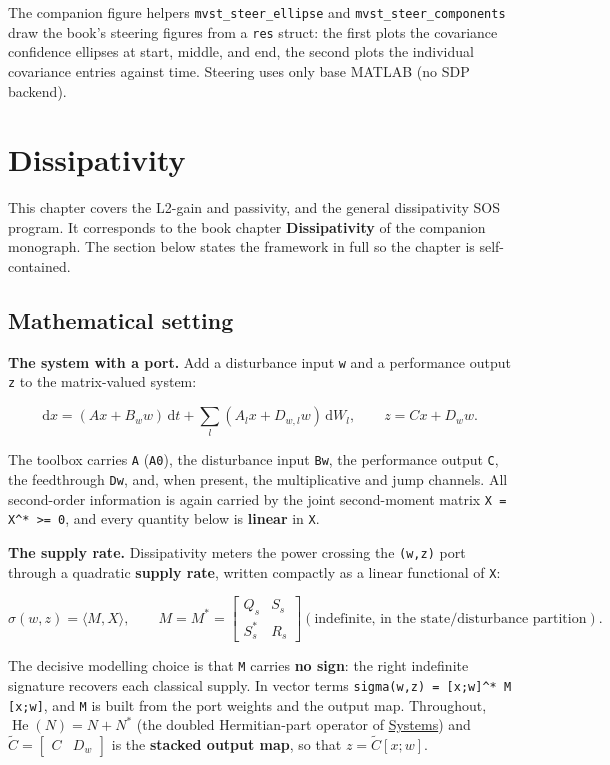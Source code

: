 \documentclass[11pt,oneside]{report}
\newcommand{\code}[1]{\texttt{#1}}
\begin{document}
The companion figure helpers \code{mvst\_steer\_ellipse} and \code{mvst\_steer\_components}
draw the book's steering figures from a \code{res} struct: the first plots the
covariance confidence ellipses at start, middle, and end, the second plots the
individual covariance entries against time. Steering uses only base MATLAB (no
SDP backend).


\hypertarget{chap:07-dissipativity}{%
\chapter{Dissipativity}\label{chap:07-dissipativity}}

This chapter covers the L2-gain and passivity, and the general dissipativity SOS
program. It corresponds to the book chapter \textbf{Dissipativity} of the companion
monograph. The section below states the framework in full so the chapter is
self-contained.

\hypertarget{mathematical-setting}{%
\section{Mathematical setting}\label{mathematical-setting}}

\textbf{The system with a port.} Add a disturbance input \code{w} and a performance
output \code{z} to the matrix-valued system:

\[
\mathrm{d}x = (A x + B_w w)\,\mathrm{d}t
   + \sum_l (A_l x + D_{w,l} w)\,\mathrm{d}W_l ,
\qquad
z = C x + D_w w .
\]

The toolbox carries \code{A} (\code{A0}), the disturbance input \code{Bw}, the performance
output \code{C}, the feedthrough \code{Dw}, and, when present, the multiplicative and jump
channels. All second-order information is again carried by the joint
second-moment matrix \code{X = X\^{}* \textgreater{}= 0}, and every quantity below is \textbf{linear} in
\code{X}.

\textbf{The supply rate.} Dissipativity meters the power crossing the \code{(w,z)} port
through a quadratic \textbf{supply rate}, written compactly as a linear functional of
\code{X}:

\[
\sigma(w,z) = \langle M, X\rangle ,
\qquad
M = M^{*} =
\begin{bmatrix} Q_s & S_s \\ S_s^{*} & R_s \end{bmatrix}
  (\text{indefinite, in the state/disturbance partition}).
\]

The decisive modelling choice is that \code{M} carries \textbf{no sign}: the right
indefinite signature recovers each classical supply. In vector terms
\code{sigma(w,z) = [x;w]\^{}* M [x;w]}, and \code{M} is built from the port weights and the
output map. Throughout, \(\operatorname{He}(N) = N + N^{*}\) (the doubled
Hermitian-part operator of \protect\hyperlink{chap:02-systems}{Systems}) and
\(\widetilde C = \begin{bmatrix} C & D_w \end{bmatrix}\) is the \textbf{stacked output map}, so that
\(z = \widetilde C [x;w]\).
\end{document}
